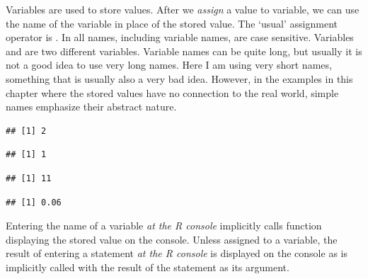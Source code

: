 \documentclass[krantz2]{krantz}\usepackage{knitr}%
\begin{document}
Variables are used to store values. After we \emph{assign} a value to variable, we can use the name of the variable in place of the stored value. The `usual' assignment operator is \Roperator{<-}. In \Rlang all names, including variable names, are case sensitive. Variables  and  are two different variables. Variable names can be quite long, but usually it is not a good idea to use very long names. Here I am using very short names, something that is usually also a very bad idea. However, in the examples in this chapter where the stored values have no connection to the real world, simple names emphasize their abstract nature.

\begin{knitrout}\footnotesize
{}\color{fgcolor}\begin{kframe}
\begin{alltt}
 \hlkwb{<-} 
 \hlopt{+} 
\end{alltt}
\begin{verbatim}
## [1] 2
\end{verbatim}
\begin{alltt}
\end{alltt}
\begin{verbatim}
## [1] 1
\end{verbatim}
\begin{alltt}
 \hlkwb{<-} 
 \hlkwb{<-}  \hlopt{+} 
\end{alltt}
\begin{verbatim}
## [1] 11
\end{verbatim}
\begin{alltt}
 \hlopt{*} 
\end{alltt}
\begin{verbatim}
## [1] 0.06
\end{verbatim}
\end{kframe}
\end{knitrout}

Entering the name of a variable \emph{at the R console} implicitly calls function  displaying the stored value on the console. Unless assigned to a variable, the result of entering a statement \emph{at the R console} is displayed on the console as  is implicitly called with the result of the statement as its argument.
\end{document}

